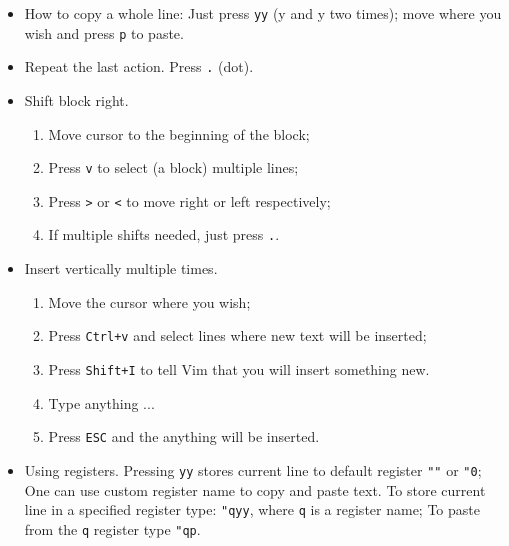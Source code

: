 \documentclass[a4paper,14pt]{article}
\begin{document}
\begin{itemize}

	\item How to copy a whole line: Just press \texttt{yy} (y and y two times); move where you wish and press \texttt{p} to paste.

        \item Repeat the last action. Press \texttt{.} (dot). 
	
	\item  Shift block right. \begin{enumerate}
		
			\item Move cursor to the beginning of the block;
			\item Press \texttt{v} to select (a block) multiple lines;
			\item Press \texttt{>} or \texttt{<} to move right or left respectively;
			\item If multiple shifts needed, just press \texttt{.}.
		\end{enumerate}


	\item  Insert vertically multiple times. \begin{enumerate}
		\item Move the cursor where you wish;
		\item Press \texttt{Ctrl+v} and select lines where new text will be inserted; 
		\item Press \texttt{Shift+I} to tell Vim that you will insert something new. 
		\item Type anything ... 
		\item Press \texttt{ESC} and the anything will be inserted.
		\end{enumerate}

	\item Using registers. Pressing \texttt{yy} stores current line to 
		default register \texttt{""} or \texttt{"0};
		One can use custom register name to copy and paste text. To store
		current line in a specified register type: \texttt{"qyy}, where \texttt{q}
		is a register name; To paste from the \texttt{q} register type \texttt{"qp}.
		

\end{itemize}
\end{document}
